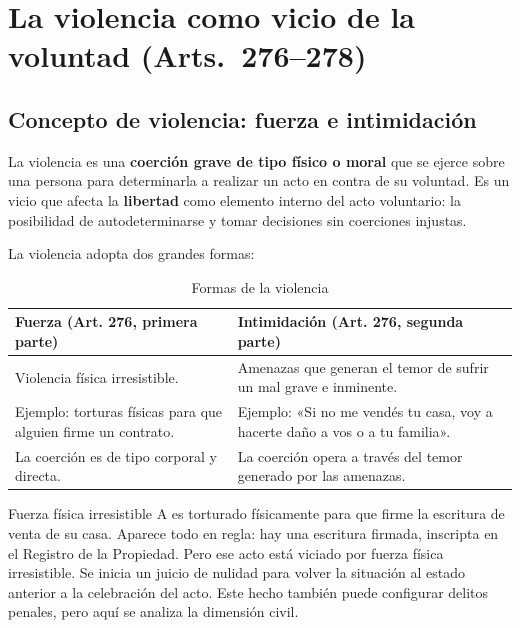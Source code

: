 \documentclass[12pt,oneside]{book}
\begin{document}
\chapter{La violencia como vicio de la voluntad (Arts.~276--278)}

\section{Concepto de violencia: fuerza e intimidación}

La violencia es una \textbf{coerción grave de tipo físico o moral} que se ejerce sobre una persona para determinarla a realizar un acto en contra de su voluntad. Es un vicio que afecta la \textbf{libertad} como elemento interno del acto voluntario: la posibilidad de autodeterminarse y tomar decisiones sin coerciones injustas.

La violencia adopta dos grandes formas:

\begin{table}[H]
\centering
\begin{tabularx}{\textwidth}{>{\raggedright\arraybackslash}X >{\raggedright\arraybackslash}X}
\toprule
\textbf{Fuerza (Art. 276, primera parte)} & \textbf{Intimidación (Art. 276, segunda parte)} \\
\midrule
Violencia física irresistible. & Amenazas que generan el temor de sufrir un mal grave e inminente. \\[4pt]
Ejemplo: torturas físicas para que alguien firme un contrato. & Ejemplo: «Si no me vendés tu casa, voy a hacerte daño a vos o a tu familia». \\[4pt]
La coerción es de tipo corporal y directa. & La coerción opera a través del temor generado por las amenazas. \\
\bottomrule
\end{tabularx}
\caption{Formas de la violencia}
\end{table}

\begin{example}{Fuerza física irresistible}
A es torturado físicamente para que firme la escritura de venta de su casa. Aparece todo en regla: hay una escritura firmada, inscripta en el Registro de la Propiedad. Pero ese acto está viciado por fuerza física irresistible. Se inicia un juicio de nulidad para volver la situación al estado anterior a la celebración del acto. Este hecho también puede configurar delitos penales, pero aquí se analiza la dimensión civil.
\end{example}
\end{document}
